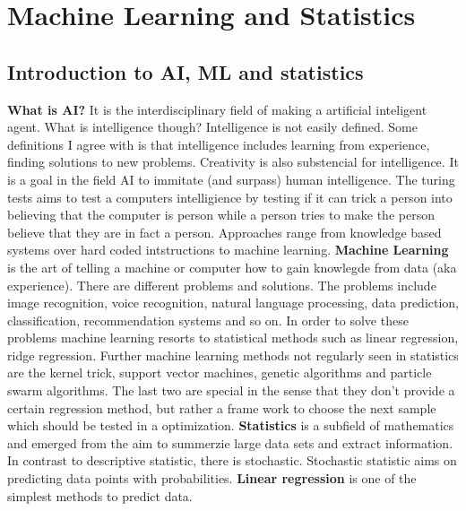 \section{Machine Learning and Statistics}

\subsection{Introduction to AI, ML and statistics}
\textbf{What is AI?} It is the interdisciplinary field of making a artificial inteligent agent. 
What is intelligence though?
Intelligence is not easily defined. Some definitions I agree with is that intelligence 
includes learning from experience, finding solutions to new problems. 
Creativity is also substencial for intelligence. 
It is a goal in the field AI to immitate (and surpass) human intelligence. 
The turing tests aims to test a computers intelligience by testing if it can trick a person into believing that the computer is person while a person tries to make the person believe that they are in fact a person. 
Approaches range from knowledge based systems over hard coded intstructions to machine learning. 
%
\textbf{Machine Learning} is the art of telling a machine or computer how to gain knowlegde from data (aka experience). 
There are different problems and solutions. 
The problems include image recognition, voice recognition, natural language processing, data prediction, classification, recommendation systems and so on. 
%
In order to solve these problems machine learning resorts to statistical methods such as
linear regression, ridge regression. 
Further machine learning methods not regularly seen in statistics are the 
kernel trick, support vector machines, genetic algorithms and particle swarm algorithms. 
The last two are special in the sense that they don't provide a certain regression method,
but rather a frame work to choose the next sample which should be tested in a optimization. 
%
\textbf{Statistics} is a subfield of mathematics and emerged from the aim to summerzie large data sets 
and extract information. In contrast to descriptive statistic, there is stochastic. 
Stochastic statistic aims on predicting data points with probabilities. 
%
\textbf{Linear regression} is one of the simplest methods to predict data. 
